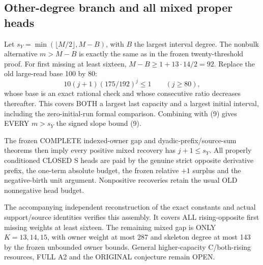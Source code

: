 \subsection{Other-degree branch and all mixed proper heads}
Let $s_Y=\min(\lfloor M/2\rfloor,M-B)$, with $B$ the largest interval
degree. The nonbulk alternative $m>M-B$ is exactly the same as in the
frozen twenty-threshold proof. For first missing at least sixteen,
$M-B\ge1+13\cdot14/2=92$. Replace the old large-read base 100 by 80:
\[
                10(j+1)(175/192)^j\le1\qquad(j\ge80),
\]
whose base is an exact rational check and whose consecutive ratio
decreases thereafter. This covers BOTH a largest last capacity and a
largest initial interval, including the zero-initial-run formal comparison.
Combining with (9) gives EVERY $m>s_Y$ the signed slope bound (9).

The frozen COMPLETE indexed-owner gap and dyadic-prefix/source-sum
theorems then imply every positive mixed recovery has $j+1\le s_Y$.
All properly conditioned CLOSED S heads are paid by the genuine strict
opposite derivative prefix, the one-term absolute budget, the frozen
relative $+1$ surplus and the negative-birth unit argument. Nonpositive
recoveries retain the usual OLD nonnegative head budget.

The accompanying independent reconstruction of the exact constants and
actual support/source identities verifies this assembly. It covers ALL
rising-opposite first missing weights at least sixteen. The remaining
mixed gap is ONLY $K=13,14,15$, with owner weight at most 287 and skeleton degree
at most 143 by the frozen unbounded owner bounds. General higher-capacity
C/both-rising resources, FULL A2 and the ORIGINAL conjecture remain OPEN.
